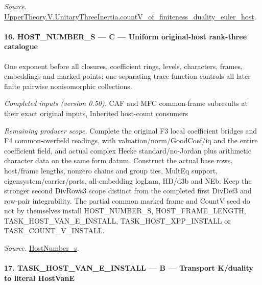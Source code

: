 \emph{Source.} \href{https://github.com/CocoSgt/riemann-hypothesis-lean/blob/7cbf7a0c32fca1badf05931879a37c3f8a2b03b4/src/Development/AutomorphicArithmetic/AutomorphicVarieties/ModularityArgument/ThresholdArguments/DenseThresholdCases/CountVOf.lean#L33-L60}{UpperTheory.V.UnitaryThreeInertia.countV\_\allowbreak of\_\allowbreak finiteness\_\allowbreak duality\_\allowbreak euler\_\allowbreak host}.



\paragraph{16. HOST\_\allowbreak NUMBER\_\allowbreak S — C — Uniform original-host rank-three catalogue}

One exponent before all closures, coefficient rings, levels, characters, frames, embeddings and marked points; one separating trace function controls all later finite pairwise nonisomorphic collections.

\emph{Completed inputs (version 0.50).} CAF and MFC common-frame subresults at their exact original inputs, Inherited host-count consumers

\emph{Remaining producer scope.} Complete the original F3 local coefficient bridges and F4 common-overfield readings, with valuation/norm/GoodCoef/iq and the entire coefficient field, and actual complex Hecke standard/no-Jordan plus arithmetic character data on the same form datum. Construct the actual base rows, host/frame lengths, nonzero chains and group ties, MultEq support, eigensystem/carrier/parts, all-embedding logLam, HD/d3b and NEb. Keep the stronger second DivRows3 scope distinct from the completed first DivDef3 and row-pair integrability. The partial common marked frame and CountV seed do not by themselves install HOST\_\allowbreak NUMBER\_\allowbreak S, HOST\_\allowbreak FRAME\_\allowbreak LENGTH, TASK\_\allowbreak HOST\_\allowbreak VAN\_\allowbreak E\_\allowbreak INSTALL, TASK\_\allowbreak HOST\_\allowbreak XPP\_\allowbreak INSTALL or TASK\_\allowbreak COUNT\_\allowbreak V\_\allowbreak INSTALL.

\emph{Source.} \href{https://github.com/CocoSgt/riemann-hypothesis-lean/blob/7cbf7a0c32fca1badf05931879a37c3f8a2b03b4/src/Development/AutomorphicArithmetic/AutomorphicVarieties/ModularityArgument/ThresholdArguments/DenseThresholdCases/HostNumberS.lean#L18-L28}{HostNumber\_\allowbreak s}.



\paragraph{17. TASK\_\allowbreak HOST\_\allowbreak VAN\_\allowbreak E\_\allowbreak INSTALL — B — Transport K/duality to literal HostVanE}

